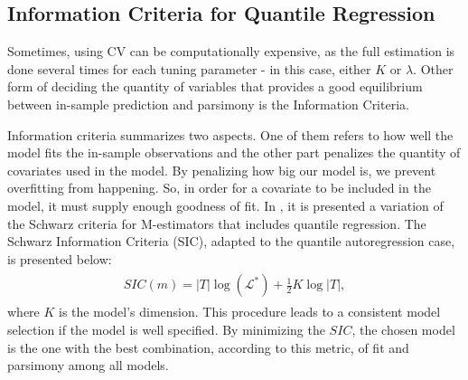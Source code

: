 

\subsection{Information Criteria for Quantile Regression}
Sometimes, using CV can be computationally expensive, as the full estimation is done several times for each tuning parameter - in this case, either $K$ or $\lambda$. Other form of deciding the quantity of variables that provides a good equilibrium between in-sample prediction and parsimony is the Information Criteria.

Information criteria summarizes two aspects. One of them refers to how well the model fits the in-sample observations and the other part penalizes the quantity of covariates used in the model. By penalizing how big our model is, we prevent overfitting from happening. So, in order for a covariate to be included in the model, it must supply enough goodness of fit.
In \cite{machado1993robust}, it is presented a variation of the Schwarz criteria for M-estimators that includes quantile regression. The Schwarz Information Criteria (SIC), adapted to the quantile autoregression case, is presented below:
\begin{align} 
\begin{split}
SIC(m) = |T| \log(\mathcal{L}^*)+\frac{1}{2}K\log |T|,\label{eq:SIC}
\end{split}					
\end{align}
where $K$ is the model's dimension. This procedure leads to a consistent model selection if the model is well specified. 
By minimizing the $SIC$, the chosen model is the one with the best combination, according to this metric, of fit and parsimony among all models. 

